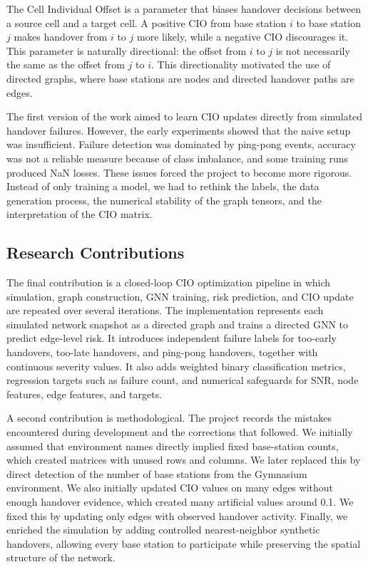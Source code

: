 \documentclass[11pt, a4paper, twoside]{article}
\begin{document}
The Cell Individual Offset is a parameter that biases handover decisions between a source cell and a target cell. A positive CIO from base station $i$ to base station $j$ makes handover from $i$ to $j$ more likely, while a negative CIO discourages it. This parameter is naturally directional: the offset from $i$ to $j$ is not necessarily the same as the offset from $j$ to $i$. This directionality motivated the use of directed graphs, where base stations are nodes and directed handover paths are edges.

The first version of the work aimed to learn CIO updates directly from simulated handover failures. However, the early experiments showed that the naive setup was insufficient. Failure detection was dominated by ping-pong events, accuracy was not a reliable measure because of class imbalance, and some training runs produced NaN losses. These issues forced the project to become more rigorous. Instead of only training a model, we had to rethink the labels, the data generation process, the numerical stability of the graph tensors, and the interpretation of the CIO matrix.

\subsection{Research Contributions}

The final contribution is a closed-loop CIO optimization pipeline in which simulation, graph construction, GNN training, risk prediction, and CIO update are repeated over several iterations. The implementation represents each simulated network snapshot as a directed graph and trains a directed GNN to predict edge-level risk. It introduces independent failure labels for too-early handovers, too-late handovers, and ping-pong handovers, together with continuous severity values. It also adds weighted binary classification metrics, regression targets such as failure count, and numerical safeguards for SNR, node features, edge features, and targets.

A second contribution is methodological. The project records the mistakes encountered during development and the corrections that followed. We initially assumed that environment names directly implied fixed base-station counts, which created matrices with unused rows and columns. We later replaced this by direct detection of the number of base stations from the Gymnasium environment. We also initially updated CIO values on many edges without enough handover evidence, which created many artificial values around 0.1. We fixed this by updating only edges with observed handover activity. Finally, we enriched the simulation by adding controlled nearest-neighbor synthetic handovers, allowing every base station to participate while preserving the spatial structure of the network.
\end{document}
